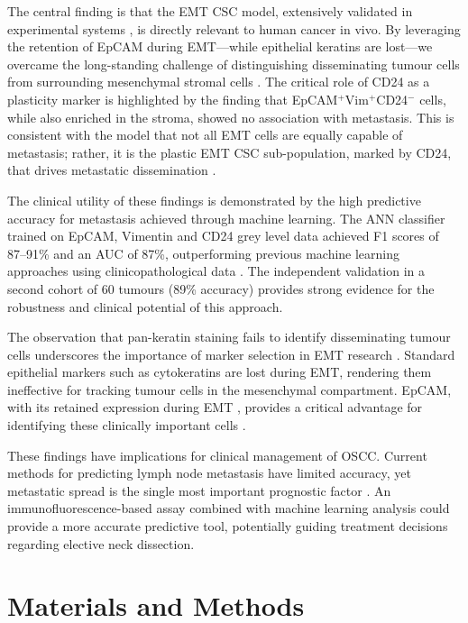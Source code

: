 \documentclass[11pt]{article}
\begin{document}
The central finding is that the EMT CSC model, extensively validated in experimental systems \citep{biddle2011, liu2014, lawson2015}, is directly relevant to human cancer in vivo. By leveraging the retention of EpCAM during EMT---while epithelial keratins are lost---we overcame the long-standing challenge of distinguishing disseminating tumour cells from surrounding mesenchymal stromal cells \citep{li2016, bill2015}. The critical role of CD24 as a plasticity marker is highlighted by the finding that EpCAM$^+$Vim$^+$CD24$^-$ cells, while also enriched in the stroma, showed no association with metastasis. This is consistent with the model that not all EMT cells are equally capable of metastasis; rather, it is the plastic EMT CSC sub-population, marked by CD24, that drives metastatic dissemination \citep{biddle2016}.

The clinical utility of these findings is demonstrated by the high predictive accuracy for metastasis achieved through machine learning. The ANN classifier trained on EpCAM, Vimentin and CD24 grey level data achieved F1 scores of 87--91\% and an AUC of 87\%, outperforming previous machine learning approaches using clinicopathological data \citep{tseng2019, bur2019, takamatsu2019}. The independent validation in a second cohort of 60 tumours (89\% accuracy) provides strong evidence for the robustness and clinical potential of this approach.

The observation that pan-keratin staining fails to identify disseminating tumour cells underscores the importance of marker selection in EMT research \citep{tan2014, desousa2015}. Standard epithelial markers such as cytokeratins are lost during EMT, rendering them ineffective for tracking tumour cells in the mesenchymal compartment. EpCAM, with its retained expression during EMT \citep{keller2019}, provides a critical advantage for identifying these clinically important cells \citep{blancas2014}.

These findings have implications for clinical management of OSCC. Current methods for predicting lymph node metastasis have limited accuracy, yet metastatic spread is the single most important prognostic factor \citep{sano2007}. An immunofluorescence-based assay combined with machine learning analysis could provide a more accurate predictive tool, potentially guiding treatment decisions regarding elective neck dissection.

\section{Materials and Methods}
\end{document}
